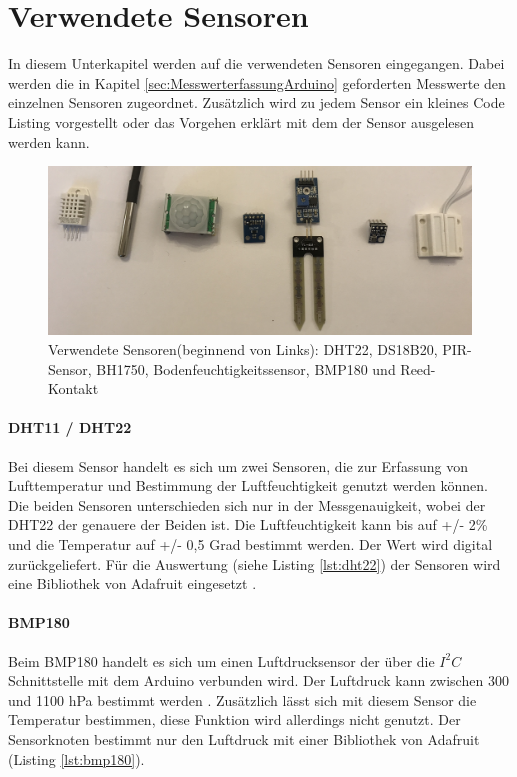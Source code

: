 \section{Verwendete Sensoren}
\label{sec:VerwendeteSensoren}
In diesem Unterkapitel werden auf die verwendeten Sensoren eingegangen. Dabei werden die in Kapitel \ref{sec:MesswerterfassungArduino} geforderten Messwerte den einzelnen Sensoren zugeordnet. Zusätzlich wird zu jedem Sensor ein kleines Code Listing vorgestellt oder das Vorgehen erklärt mit dem der Sensor ausgelesen werden kann.
\begin{figure}[h!]
	\centering
	\includegraphics[width=1\textwidth]{bilder/sensoren}
	\caption[Verwendete Sensoren]{Verwendete Sensoren(beginnend von Links): DHT22, DS18B20, PIR-Sensor, BH1750, Bodenfeuchtigkeitssensor, BMP180  und Reed-Kontakt}
	\label{img:verwendeteSensoren}
\end{figure}

\paragraph{DHT11 / DHT22} Bei diesem Sensor handelt es sich um zwei Sensoren, die zur Erfassung von Lufttemperatur und Bestimmung der Luftfeuchtigkeit genutzt werden können. Die beiden Sensoren unterschieden sich nur in der Messgenauigkeit, wobei der DHT22 der genauere der Beiden ist. Die Luftfeuchtigkeit kann bis auf +/- 2\% und die Temperatur auf +/- 0,5 Grad bestimmt werden. Der Wert wird digital zurückgeliefert. Für die Auswertung (siehe Listing \ref{lst:dht22}) der Sensoren wird eine Bibliothek von Adafruit eingesetzt \cite{adafruit2016dht}.



\paragraph{BMP180} Beim BMP180 handelt es sich um einen Luftdrucksensor der über die $I^2C$ Schnittstelle mit dem Arduino verbunden wird. Der Luftdruck kann zwischen 300 und 1100 hPa bestimmt werden \cite{sensortec2013data}. Zusätzlich lässt sich mit diesem Sensor die Temperatur bestimmen, diese Funktion wird allerdings nicht genutzt. Der Sensorknoten bestimmt nur den Luftdruck mit einer Bibliothek von Adafruit (Listing \ref{lst:bmp180}). 


